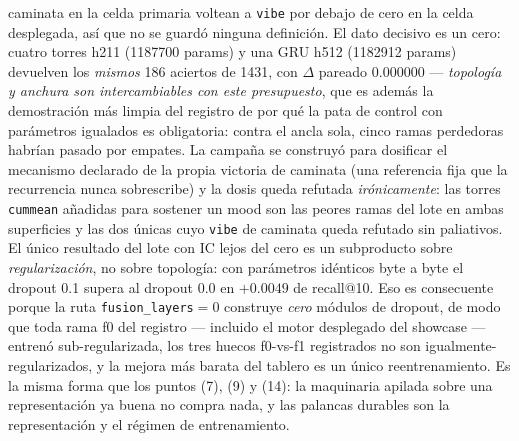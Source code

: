 \documentclass[11pt]{article}
\begin{document}
caminata en la celda primaria voltean a \texttt{vibe} por debajo de cero en la
celda desplegada, así que no se guardó ninguna definición. El dato decisivo es un
cero: cuatro torres h211 (\num{1187700} params) y una GRU h512 (\num{1182912}
params) devuelven los \emph{mismos} \num{186} aciertos de \num{1431}, con
$\Delta$ pareado \num{0.000000} --- \emph{topología y anchura son intercambiables
con este presupuesto}, que es además la demostración más limpia del registro de por
qué la pata de control con parámetros igualados es obligatoria: contra el ancla
sola, cinco ramas perdedoras habrían pasado por empates. La campaña se construyó
para dosificar el mecanismo declarado de la propia victoria de caminata (una
referencia fija que la recurrencia nunca sobrescribe) y la dosis queda refutada
\emph{irónicamente}: las torres \texttt{cummean} añadidas para sostener un mood
son las peores ramas del lote en ambas superficies y las dos únicas cuyo
\texttt{vibe} de caminata queda refutado sin paliativos. El único resultado del
lote con IC lejos del cero es un subproducto sobre \emph{regularización}, no sobre
topología: con parámetros idénticos byte a byte el dropout \num{0.1} supera al
dropout \num{0.0} en $+\num{0.0049}$ de recall@10. Eso es consecuente porque la
ruta \texttt{fusion\_layers}${}=0$ construye \emph{cero} módulos de dropout, de
modo que toda rama f0 del registro --- incluido el motor desplegado del showcase
--- entrenó sub-regularizada, los tres huecos f0-vs-f1 registrados no son
igualmente-regularizados, y la mejora más barata del tablero es un único
reentrenamiento. Es la misma forma que los puntos (7), (9) y (14): la maquinaria
apilada sobre una representación ya buena no compra nada, y las palancas durables
son la representación y el régimen de entrenamiento.
\end{document}
